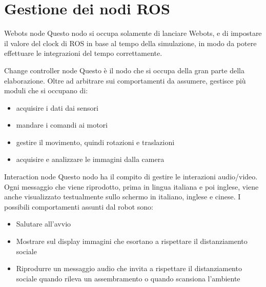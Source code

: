 \documentclass[10pt]{beamer}
\begin{document}
	\section{Gestione dei nodi ROS}\label{sec:Ros}
	\frame{\sectionpage}


	\begin{frame}{Webots node}
	Questo nodo si occupa solamente di lanciare Webots, e di impostare il
	valore del clock di ROS in base al tempo della simulazione, in modo da
	potere effettuare le integrazioni del tempo correttamente.
	\end{frame}
	\begin{frame}{Change controller node}
	Questo è il nodo che si occupa della gran parte della elaborazione. Oltre
	ad arbitrare sui comportamenti da assumere, gestisce più moduli che si
	occupano di: 
	\begin{itemize}
		\pause\item acquisire i dati dai sensori
		\pause\item mandare i comandi ai motori
		\pause\item gestire il movimento, quindi rotazioni e traslazioni
		\pause\item acquisire e analizzare le immagini dalla camera
	\end{itemize}
	\end{frame}

	\begin{frame}{Interaction node}
	Questo nodo ha il compito di gestire le interazioni audio/video. Ogni
	messaggio che viene riprodotto, prima in lingua italiana e poi inglese,
	viene anche visualizzato testualmente sullo schermo in italiano, inglese e
	cinese.  I possibili comportamenti assunti dal robot sono:
	\begin{itemize}
		\pause\item Salutare all'avvio
		\pause\item Mostrare sul display immagini che esortano a rispettare il
			distanziamento sociale
		\pause\item Riprodurre un messaggio audio che invita a rispettare il distanziamento sociale quando
			rileva un assembramento o quando scansiona l'ambiente
	\end{itemize}
	\end{frame}
\end{document}
